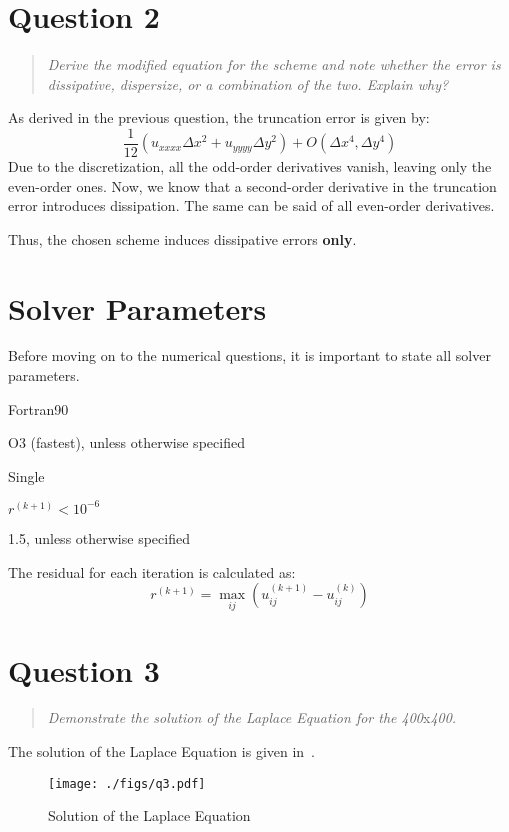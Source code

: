 \documentclass{SelimArticle}
\begin{document}
\section{Question 2}
\begin{quote}
    \textit{Derive the modified equation for the scheme and note whether the error is dissipative,
    dispersize, or a combination of the two. Explain why?}
\end{quote}
As derived in the previous question, the truncation error is given by:
$$
    \frac{1}{12}\left(u_{xxxx}\Delta x ^2 + u_{yyyy}\Delta y^2 \right)
    + O(\Delta x^4, \Delta y^4)
$$
Due to the discretization, all the odd-order derivatives vanish, leaving only the even-order ones.
Now, we know that a second-order derivative in the truncation error introduces dissipation.
The same can be said of all even-order derivatives.

Thus, the chosen scheme induces dissipative errors \textbf{only}.

\section{Solver Parameters}
Before moving on to the numerical questions, it is important to state all solver parameters.
\begin{description}[noitemsep]
    \item[Programming Language:] Fortran90
    \item[Optimization Level:] O3 (fastest), unless otherwise specified
    \item[Precision:] Single
    \item[Convergence Criteria:] $r^{(k+1)} < 10^{-6}$
    \item[Relaxation Parameter:] 1.5, unless otherwise specified
\end{description}

The residual for each iteration is calculated as:
$$
r^{(k+1)} = \max_{ij}\left( u^{(k+1)}_{ij} - u^{(k)}_{ij} \right)
$$
\section{Question 3}
\begin{quote}
    \textit{Demonstrate the solution of the Laplace Equation for the 400}x\textit{400.}
\end{quote}
The solution of the Laplace Equation is given in~.
\begin{figure}[H]
    \centering
    \texttt{[image: ./figs/q3.pdf]}
    \caption{Solution of the Laplace Equation}\label{fig:q3}
\end{figure}
\end{document}

